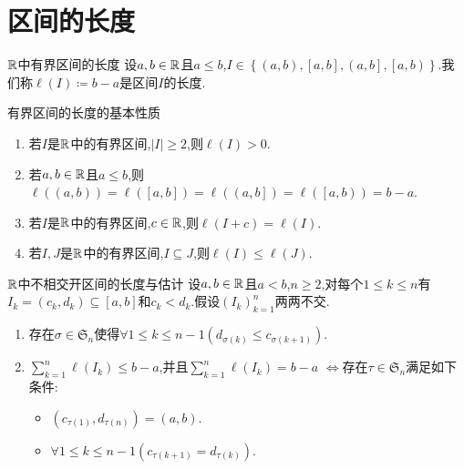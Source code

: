 \section{区间的长度}

\begin{definition}{$\mathbb{R}$中有界区间的长度}{}
	设$a,b\in\mathbb{R}$且$a\leqslant b$,$I\in\left\{\left(a,b\right),\left[a,b\right],\left(a,b\right],\left[a,b\right)\right\}$.我们称$\ell\left(I\right)\coloneq b-a$是区间$I$的长度.
\end{definition}

\begin{proposition}{有界区间的长度的基本性质}{}
	\begin{enumerate}
		\item 若$I$是$\mathbb{R}$中的有界区间,$\left|I\right|\geq 2$,则$\ell\left(I\right)>0$.
		\item 若$a,b\in\mathbb{R}$且$a\leq b$,则$\ell\left(\left(a,b\right)\right)=\ell\left(\left[a,b\right]\right)=\ell\left(\left(a,b\right]\right)=\ell\left(\left[a,b\right)\right)=b-a$.
		\item 若$I$是$\mathbb{R}$中的有界区间,$c\in\mathbb{R}$,则$\ell\left(I+c\right)=\ell\left(I\right)$.
		\item 若$I,J$是$\mathbb{R}$中的有界区间,$I\subseteq J$,则$\ell\left(I\right)\leq\ell\left(J\right)$.
	\end{enumerate}
\end{proposition}

\begin{proposition}{$\mathbb{R}$中不相交开区间的长度与估计}{}
	设$a,b\in\mathbb{R}$且$a<b$,$n\geq 2$,对每个$1\leq k\leq n$有$I_{k}=\left(c_{k},d_{k}\right)\subseteq\left[a,b\right]$和$c_{k}<d_{k}$.假设$\left(I_{k}\right)_{k=1}^{n}$两两不交.
	\begin{enumerate}
		\item 存在$\sigma\in\mathfrak{S}_{n}$使得$\forall 1\leq k\leq n-1\left(d_{\sigma\left(k\right)}\leq c_{\sigma\left(k+1\right)}\right)$.
		\item $\sum\limits_{k=1}^{n}\ell\left(I_{k}\right)\leq b-a$,并且$\sum\limits_{k=1}^{n}\ell\left(I_{k}\right)=b-a$ $\iff$存在$\tau\in\mathfrak{S}_{n}$满足如下条件:
		\begin{itemize}
			\item $\left(c_{\tau\left(1\right)},d_{\tau\left(n\right)}\right)=\left(a,b\right)$.
			\item $\forall 1\leq k\leq n-1\left(c_{\tau\left(k+1\right)}=d_{\tau\left(k\right)}\right)$.
		\end{itemize}
\end{enumerate}	
\end{proposition}
